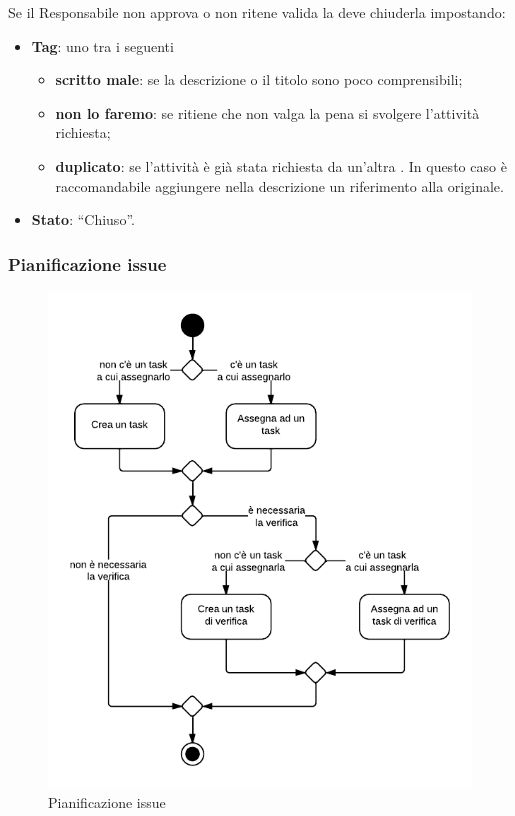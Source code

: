 Se il Responsabile non approva o non ritene valida la  deve chiuderla impostando:
\begin{itemize}
 \item \textbf{Tag}: uno tra i seguenti
  \begin{itemize}
   \item \textbf{scritto male}: se la descrizione o il titolo sono poco comprensibili;
   \item \textbf{non lo faremo}: se ritiene che non valga la pena si svolgere l'attività richiesta;
   \item \textbf{duplicato}: se l'attività è già stata richiesta da un'altra . In questo caso è raccomandabile aggiungere nella descrizione un riferimento alla  originale.
  \end{itemize}
 \item \textbf{Stato}: ``Chiuso''.
\end{itemize}

\subsubsection{Pianificazione issue}
\label{pianificazione}

\begin{figure}[H]
    \centering
    \includegraphics[width=12cm]{uml-processi/pianificazione_issue.png}
    \caption{Pianificazione issue}
\end{figure}

